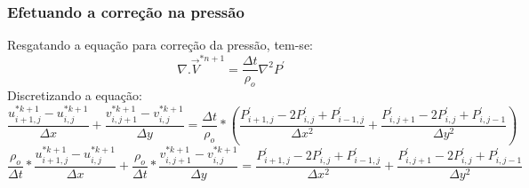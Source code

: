 \documentclass[xcolor=dvipsnames,10pt,aspectratio=169]{beamer}
\begin{document}
	\begin{frame}
		\frametitle{Efetuando a correção na pressão}
		Resgatando a equação para correção da pressão, tem-se:
		\begin{equation}
			\nabla .\vec{V}^{\ast{n + 1}} = \frac{\Delta t}{\rho_o} \nabla^2 P^\prime
		\end{equation}
		Discretizando a equação:
		\begin{equation}
			\frac{u_{i + 1 , j}^{\ast k + 1} - u_{i , j}^{\ast k + 1}}{\Delta x} + \frac{v_{i , j + 1}^{\ast k + 1} - v_{i , j}^{\ast k + 1}}{\Delta y} = \frac{\Delta t}{\rho_o} * \left( \frac{ P^{\prime}_{i + 1, j} - 2 P^{\prime}_{i , j} + P^{\prime}_{i - 1 , j} }{\Delta x^2} + \frac{ P^{\prime}_{i, j + 1} - 2 P^{\prime}_{i , j} + P^{\prime}_{i , j- 1} }{\Delta y^2} \right) 
		\end{equation}
		\begin{equation}
		\frac{\rho_o}{ \Delta t} * \frac{u_{i + 1 , j}^{\ast k + 1} - u_{i , j}^{\ast k + 1}}{\Delta x} + \frac{\rho_o}{ \Delta t} * \frac{v_{i , j + 1}^{\ast k + 1} - v_{i , j}^{\ast k + 1}}{\Delta y} =  \frac{ P^{\prime}_{i + 1, j} - 2 P^{\prime}_{i , j} + P^{\prime}_{i - 1 , j} }{\Delta x^2} + \frac{ P^{\prime}_{i, j + 1} - 2 P^{\prime}_{i , j} + P^{\prime}_{i , j- 1} }{\Delta y^2} 
		\end{equation}
		
		
		
	\end{frame}

	
	
\end{document}
